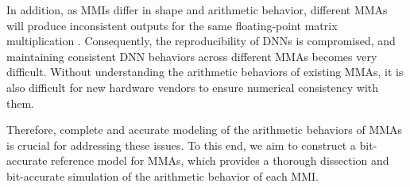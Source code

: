 In addition, as MMIs differ in shape and arithmetic behavior, different MMAs will produce inconsistent outputs for the same floating-point matrix multiplication \cite{li_discovery_2024}. Consequently, the reproducibility of DNNs is compromised, and maintaining consistent DNN behaviors across different MMAs becomes very difficult. Without understanding the arithmetic behaviors of existing MMAs, it is also difficult for new hardware vendors to ensure numerical consistency with them.

Therefore, complete and accurate modeling of the arithmetic behaviors of MMAs is crucial for addressing these issues. To this end, we aim to construct a bit-accurate reference model for MMAs, which provides a thorough dissection and bit-accurate simulation of the arithmetic behavior of each MMI.
